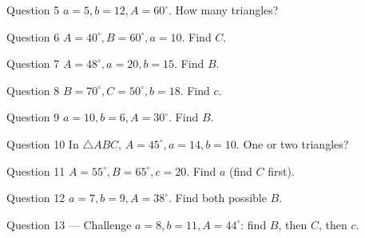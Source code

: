 \documentclass[11pt]{article}
\begin{document}
\begin{qbox}{Question 5}
$a=5,b=12,A=60^\circ$. How many triangles?\workspace{2.4cm}
\end{qbox}

\begin{qbox}{Question 6}
$A=40^\circ,B=60^\circ,a=10$. Find $C$.\workspace{2.4cm}
\end{qbox}

\begin{qbox}{Question 7}
$A=48^\circ,a=20,b=15$. Find $B$.\workspace{2.4cm}
\end{qbox}

\begin{qbox}{Question 8}
$B=70^\circ,C=50^\circ,b=18$. Find $c$.\workspace{2.4cm}
\end{qbox}

\begin{qbox}{Question 9}
$a=10,b=6,A=30^\circ$. Find $B$.\workspace{2.4cm}
\end{qbox}

\begin{qbox}{Question 10}
In $\triangle ABC$, $A=45^\circ,a=14,b=10$. One or two triangles?\workspace{2.4cm}
\end{qbox}

\begin{qbox}{Question 11}
$A=55^\circ,B=65^\circ,c=20$. Find $a$ (find $C$ first).\workspace{2.4cm}
\end{qbox}

\begin{qbox}{Question 12}
$a=7,b=9,A=38^\circ$. Find both possible $B$.\workspace{2.4cm}
\end{qbox}

\begin{qbox}{Question 13 --- Challenge}
$a=8,b=11,A=44^\circ$: find $B$, then $C$, then $c$.\workspace{3.4cm}
\end{qbox}

\clearpage
{}
\end{document}
